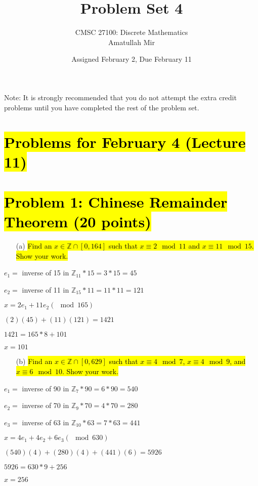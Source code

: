 \documentclass[12pt]{article}
\title{Problem Set 4}
\author{CMSC 27100: Discrete Mathematics\\ Amatullah Mir}
\date{Assigned February 2, Due February 11}
\begin{document}
\maketitle
\thispagestyle{empty}

\noindent \item Note: It is strongly recommended that you do not attempt the extra credit
problems until you have completed the rest of the problem set.
\section{\hl{Problems for February 4 (Lecture 11)}}
\section*{\hl{Problem 1: Chinese Remainder Theorem (20 points)}}

\begin{enumerate}
\item[(a)] \hl{Find an $x \in \mathbb{Z} \cap [0,164]$ such that $x \equiv 2 \mod 11$ 
and $x \equiv 11 \mod 15$. Show your work.}
\end{enumerate}
\item $e_1 = $ inverse of 15 in $\mathbb{Z}_{11} * 15 = 3 * 15 = 45$
\item $e_2 = $ inverse of 11 in $\mathbb{Z}_{15} * 11 = 11 * 11 = 121$
\item $x = 2e_{1} + 11e_{2} (\mod 165)$
\item $(2)(45)+(11)(121) = 1421$
\item $1421 = 165*8 + 101$
\item $x = 101$


\begin{enumerate}
\item[(b)] \hl{Find an $x \in \mathbb{Z} \cap [0,629]$ such that $x \equiv 4 \mod 7$, 
$x \equiv 4 \mod 9$, and $x \equiv 6 \mod 10$. Show your work.}
\end{enumerate}

\item $e_1 = $ inverse of 90 in $\mathbb{Z}_{7} * 90 = 6 * 90 = 540$
\item $e_2 = $ inverse of 70 in $\mathbb{Z}_{9} * 70 = 4 * 70 = 280$
\item $e_3 = $ inverse of 63 in $\mathbb{Z}_{10} * 63 = 7 * 63 = 441$
\item $x = 4e_{1} + 4e_{2} + 6e_{3} (\mod 630)$
\item $(540)(4)+(280)(4) + (441)(6) = 5926$
\item $5926 = 630*9 + 256$
\item $x = 256$
\end{document}
